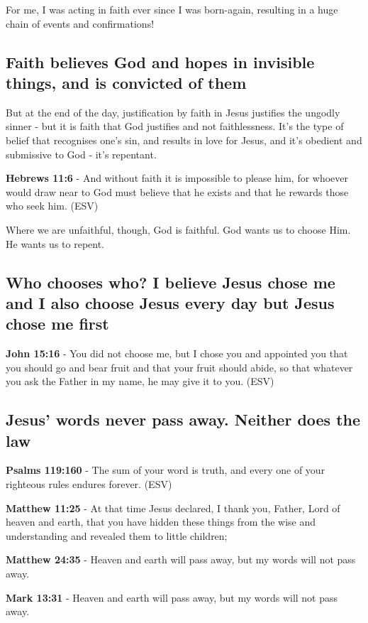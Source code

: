 \documentclass[11pt]{article}
\begin{document}
For me, I was acting in faith ever since I was born-again, resulting in a huge chain of events and confirmations!

\subsection{Faith believes God and hopes in invisible things, and is convicted of them}
\label{sec:orgbabcdab}

But at the end of the day, justification by faith in Jesus justifies the ungodly sinner - but it is faith that God justifies and not faithlessness. It's the type of belief that recognises one's sin, and results in love for Jesus, and it's obedient and submissive to God - it's repentant.

\textbf{Hebrews 11:6} - And without faith it is impossible to please him, for whoever would draw near to God must believe that he exists and that he rewards those who seek him. (ESV)

Where we are unfaithful, though, God is faithful. God wants us to choose Him. He wants us to repent.

\subsection{Who chooses who? I believe Jesus chose me and I also choose Jesus every day but Jesus chose me first}
\label{sec:org1c1045d}
\textbf{John 15:16} - You did not choose me, but I chose you and appointed you that you should go and bear fruit and that your fruit should abide, so that whatever you ask the Father in my name, he may give it to you. (ESV)

\subsection{Jesus' words never pass away. Neither does the law}
\label{sec:org37d89bc}
\textbf{Psalms 119:160} - The sum of your word is truth, and every one of your righteous rules endures forever. (ESV)

\textbf{Matthew 11:25} - At that time Jesus declared, I thank you, Father, Lord of heaven and earth, that you have hidden these things from the wise and understanding and revealed them to little children;

\textbf{Matthew 24:35} - Heaven and earth will pass away, but my words will not pass away.

\textbf{Mark 13:31} - Heaven and earth will pass away, but my words will not pass away.
\end{document}
